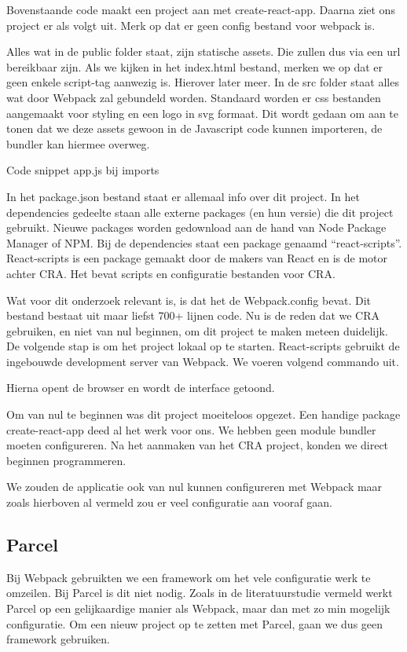 Bovenstaande code maakt een project aan met create-react-app. Daarna ziet ons project er als volgt uit. Merk op dat er geen config bestand voor webpack is.


Alles wat in de public folder staat, zijn statische assets. Die zullen dus via een url bereikbaar zijn. Als we kijken in het index.html bestand, merken we op dat er geen enkele script-tag aanwezig is. Hierover later meer.
In de src folder staat alles wat door Webpack zal gebundeld worden. Standaard worden er css bestanden aangemaakt voor styling en een logo in svg formaat. Dit wordt gedaan om aan te tonen dat we deze assets gewoon in de Javascript code kunnen importeren, de bundler kan hiermee overweg. 

Code snippet app.js bij imports

In het package.json bestand staat er allemaal info over dit project. In het dependencies gedeelte staan alle externe packages (en hun versie) die dit project gebruikt. Nieuwe packages worden gedownload aan de hand van Node Package Manager of NPM. Bij de dependencies staat een package genaamd “react-scripts”. React-scripts is een package gemaakt door de makers van React en is de motor achter CRA. Het bevat scripts en configuratie bestanden voor CRA. 

Wat voor dit onderzoek relevant is, is dat het de Webpack.config bevat. Dit bestand bestaat uit maar liefst 700+ lijnen code. Nu is de reden dat we CRA gebruiken, en niet van nul beginnen, om dit project te maken meteen duidelijk. 
De volgende stap is om het project lokaal op te starten. React-scripts gebruikt de ingebouwde development server van Webpack. We voeren volgend commando uit.

Hierna opent de browser en wordt de interface getoond. 

Om van nul te beginnen was dit project moeiteloos opgezet. Een handige package create-react-app deed al het werk voor ons. We hebben geen module bundler moeten configureren. Na het aanmaken van het CRA project, konden we direct beginnen programmeren. 

We zouden de applicatie ook van nul kunnen configureren met Webpack maar zoals hierboven al vermeld zou er veel configuratie aan vooraf gaan.

\subsection{Parcel}
Bij Webpack gebruikten we een framework om het vele configuratie werk te omzeilen. Bij Parcel is dit niet nodig. Zoals in de literatuurstudie vermeld werkt Parcel op een gelijkaardige manier als Webpack, maar dan met zo min mogelijk configuratie. Om een nieuw project op te zetten met Parcel, gaan we dus geen framework gebruiken.

